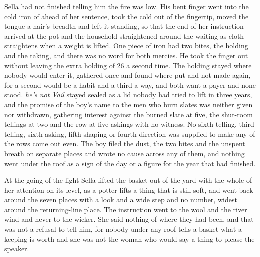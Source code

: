 Sella had not finished telling him the fire was low. His bent finger went into the cold iron of  ahead of her sentence, took the cold out of the fingertip, moved the tongue a hair's breadth and left it standing, so that the end of her instruction arrived at the pot and the household straightened around the waiting as cloth straightens when a weight is lifted. One piece of iron had two bites, the holding and the taking, and there was no  word for both mercies. He took the finger out without leaving the extra holding of  26 a second time. The holding stayed where nobody would enter it, gathered once and found where put and not made again, for a second would be a habit and a third a way, and both want a payer and none stood. \emph{he's not Vail} stayed sealed as a lid nobody had tried to lift in three years, and the promise of the boy's name to the men who burn slates was neither given nor withdrawn, gathering interest against the burned slate at five, the shut-room tellings at two and the row at five askings with no witness. No sixth telling, third telling, sixth asking, fifth shaping or fourth direction was supplied to make any of the rows come out even. The boy filed the dust, the two bites and the unspent breath on separate places and wrote no cause across any of them, and nothing went under the roof as a sign of the day or a figure for the year that had finished.

\scenebreak

At the going of the light Sella lifted the basket out of the yard with the whole of her attention on its level, as a potter lifts a thing that is still soft, and went back around the seven places with a look and a wide step and no number, widest around the returning-line place. The instruction went to the wool and the river wind and never to the wicker. She said nothing of where they had been, and that was not a refusal to tell him, for nobody under any roof tells a basket what a keeping is worth and she was not the woman who would say a thing to please the speaker.

